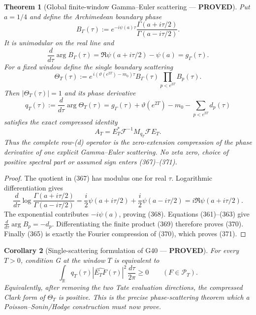 \documentclass[11pt]{article}
\newtheorem{theorem}{Theorem}
\newtheorem{corollary}[theorem]{Corollary}
\newcommand{\PROVED}{\textcolor{green!45!black}{\textbf{PROVED}}}
\begin{document}
\begin{theorem}[Global finite-window Gamma--Euler scattering --- \PROVED]
Put $a=1/4$ and define the Archimedean boundary phase
\begin{equation}
 B_\Gamma(\tau):=
 e^{-i\psi(a)\tau}
 \frac{\Gamma(a+i\tau/2)}{\Gamma(a-i\tau/2)}.        \tag{367}
\end{equation}
It is unimodular on the real line and
\begin{equation}
 \frac{d}{d\tau}\arg B_\Gamma(\tau)
 =\Re\psi(a+i\tau/2)-\psi(a)=g_\Gamma(\tau).        \tag{368}
\end{equation}
For a fixed window define the single boundary scattering
\begin{equation}
 \Theta_T(\tau):=
 e^{\,i(\vartheta(e^{2T})-m_0)\tau}
 B_\Gamma(\tau)
 \prod_{p<e^{2T}}B_p(\tau).                         \tag{369}
\end{equation}
Then $|\Theta_T(\tau)|=1$ and its phase derivative
\begin{equation}
 q_T(\tau):=\frac{d}{d\tau}\arg\Theta_T(\tau)
 =g_\Gamma(\tau)+\vartheta(e^{2T})-m_0
   -\sum_{p<e^{2T}}d_p(\tau)                        \tag{370}
\end{equation}
satisfies the exact compressed identity
\begin{equation}
 \boxed{A_T=E_T^*\mathcal F^{-1}M_{q_T}\mathcal FE_T.} \tag{371}
\end{equation}
Thus the complete row-(d) operator is the zero-extension compression of the
phase derivative of one explicit Gamma--Euler scattering.  No zeta zero,
choice of positive spectral part or assumed sign enters (367)--(371).
\end{theorem}

\begin{proof}
The quotient in (367) has modulus one for real $\tau$.  Logarithmic
differentiation gives
\[
 \frac{d}{d\tau}\log
 \frac{\Gamma(a+i\tau/2)}{\Gamma(a-i\tau/2)}
 =\frac i2\psi(a+i\tau/2)+\frac i2\psi(a-i\tau/2)
 =i\Re\psi(a+i\tau/2).
\]
The exponential contributes $-i\psi(a)$, proving (368).  Equations
(361)--(363) give
$\frac d{d\tau}\arg B_p=-d_p$.  Differentiating the finite product (369)
therefore proves (370).  Finally (365) is exactly the Fourier compression of
(370), which proves (371).
\end{proof}

\begin{corollary}[Single-scattering formulation of G40 --- \PROVED]
For every $T>0$, condition G at the window $T$ is equivalent to
\begin{equation}
 \boxed{
 \int_{\mathbb R}q_T(\tau)
       |\widehat{E_TF}(\tau)|^2\,\frac{d\tau}{2\pi}
 \ge0\qquad(F\in\mathcal P_T).}                    \tag{372}
\end{equation}
Equivalently, after removing the two Tate evaluation directions, the
compressed Clark form of $\Theta_T$ is positive.  This is the precise
phase-scattering theorem which a Poisson--Sonin/Hodge construction must now
prove.
\end{corollary}
\end{document}
